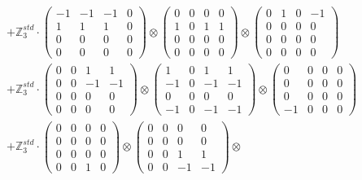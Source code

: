 \documentclass{article}
\begin{document}
{\begin{align}
        &+ \label{Rs16-Rc11-Solution-11-c22} \mathbb{Z}_3^{std} \cdot 
            \begin{pmatrix} -1 & -1 & -1 & 0 \\ 1 & 1 & 1 & 0 \\ 0 & 0 & 0 & 0 \\ 0 & 0 & 0 & 0 \end{pmatrix} \otimes 
            \begin{pmatrix} 0 & 0 & 0 & 0 \\ 1 & 0 & 1 & 1 \\ 0 & 0 & 0 & 0 \\ 0 & 0 & 0 & 0 \end{pmatrix} \otimes 
            \begin{pmatrix} 0 & 1 & 0 & -1 \\ 0 & 0 & 0 & 0 \\ 0 & 0 & 0 & 0 \\ 0 & 0 & 0 & 0 \end{pmatrix} \\ 
        &+ \label{Rs16-Rc11-Solution-11-c23} \mathbb{Z}_3^{std} \cdot 
            \begin{pmatrix} 0 & 0 & 1 & 1 \\ 0 & 0 & -1 & -1 \\ 0 & 0 & 0 & 0 \\ 0 & 0 & 0 & 0 \end{pmatrix} \otimes 
            \begin{pmatrix} 1 & 0 & 1 & 1 \\ -1 & 0 & -1 & -1 \\ 0 & 0 & 0 & 0 \\ -1 & 0 & -1 & -1 \end{pmatrix} \otimes 
            \begin{pmatrix} 0 & 0 & 0 & 0 \\ 0 & 0 & 0 & 0 \\ 0 & 0 & 0 & 0 \\ -1 & 0 & 0 & 0 \end{pmatrix} \\ 
        &+ \label{Rs16-Rc11-Solution-11-c24} \mathbb{Z}_3^{std} \cdot 
            \begin{pmatrix} 0 & 0 & 0 & 0 \\ 0 & 0 & 0 & 0 \\ 0 & 0 & 0 & 0 \\ 0 & 0 & 1 & 0 \end{pmatrix} \otimes 
            \begin{pmatrix} 0 & 0 & 0 & 0 \\ 0 & 0 & 0 & 0 \\ 0 & 0 & 1 & 1 \\ 0 & 0 & -1 & -1 \end{pmatrix} \otimes 

\end{align}}
\end{document}

